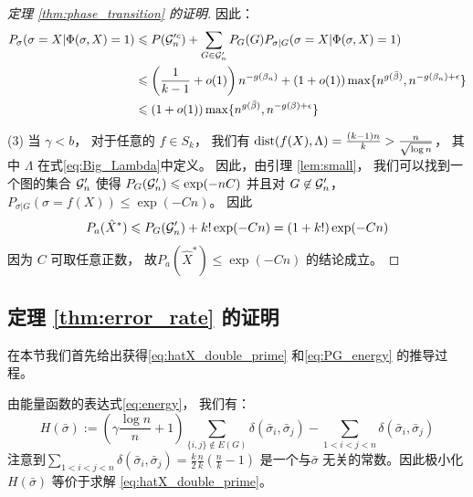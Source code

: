 \begin{proof}[定理 \ref{thm:phase_transition} 的证明]
	因此：
	\begin{align*}
	P_{\sigma}(\sigma=X| \Phi(\sigma, X)=1)  &\leqslant  P(\mathcal{G}'^c_n) + \sum_{G\in \mathcal{G}'_n}P_G(G) P_{\sigma|G}(\sigma=X| \Phi(\sigma, X)=1) \\
	& \leqslant \left(
    \frac{1}{k-1}+o(1) \right)
    n^{-g(\beta_n)} + (1+o(1)) \max\{n^{g(\bar{\beta})}, n^{- g(\beta_n) + \epsilon} \}\\
	& \leqslant (1+o(1)) \max\{n^{g(\bar{\beta})}, n^{-g(\beta) + \epsilon}  \}
	\end{align*}
	
	(3) 当 $\gamma < b$，
  对于任意的 $f\in S_k$，
  我们有
  $\operatorname{dist}(f(X), \Lambda) = \frac{(k-1)n}{k} > \frac{n}{\sqrt{\log n}}$，
  其中 $\Lambda$ 在式\eqref{eq:Big_Lambda}中定义。
	因此，由引理 \ref{lem:small}，
  我们可以找到一个图的集合 $\mathcal{G}'_n$
  使得 $P_G(\mathcal{G}'_n) \leqslant \exp(-nC)$
	并且对 $G\not \in \mathcal{G}'_n$， $P_{\sigma|G}(\sigma = f(X)) \leq \exp(-Cn)$。
  因此
	\begin{align*}
	P_a(\hat{X}^*) \leqslant P_G(\mathcal{G}'_n) + k! \exp(-Cn) = (1+k!)\exp (-Cn)
	\end{align*}
	因为 $C$
  可取任意正数，
	故$P_a \left(\hat{X}^* \right) \leq \exp(-Cn)$
  的结论成立。
\end{proof}
\subsection{定理 \ref{thm:error_rate} 的证明}
在本节我们首先给出获得\eqref{eq:hatX_double_prime}
和\eqref{eq:PG_energy} 的推导过程。

由能量函数的表达式\eqref{eq:energy}，
我们有：
\begin{equation}
	H(\bar{\sigma}) := \left(
    \gamma \frac{\log n}{n} + 1 \right)\sum_{\{i,j\}\not\in E(G)} \delta(\bar{\sigma}_i, \bar{\sigma}_j)
	- \sum_{1<i<j<n} \delta(\bar{\sigma}_i, \bar{\sigma}_j)
\end{equation}
注意到$\sum_{1<i<j<n} \delta(\bar{\sigma}_i, \bar{\sigma}_j)=\frac{k}{2}\frac{n}{k}(\frac{n}{k}-1)$
是一个与$\bar{\sigma}$ 无关的常数。因此极小化
$H(\bar{\sigma}) $ 等价于求解
\eqref{eq:hatX_double_prime}。

